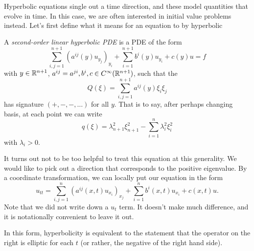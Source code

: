 \documentclass[a4paper]{article}
\begin{document}
Hyperbolic equations single out a time direction, and these model quantities that evolve in time. In this case, we are often interested in initial value problems instead. Let's first define what it means for an equation to by hyperbolic

\begin{defi}
  A \emph{second-order linear hyperbolic PDE} is a PDE of the form
  \[
    \sum_{i, j = 1}^{n + 1} (a^{ij}(y) u_{y_j})_{y_i} + \sum_{i = 1}^{n + 1} b^i(y) u_{y_i} + c(y) u = f
  \]
  with $y \in \mathbb{R}^{n + 1}$, $a^{ij} = a^{ji}, b^i, c \in C^\infty(\mathbb{R}^{n + 1})$, such that the 
  \[
    Q(\xi) = \sum_{i, j = 1}^{n + 1} a^{ij}(y) \xi_i \xi_j
  \]
  has signature $(+, -, -, \ldots)$ for all $y$. That is to say, after perhaps changing basis, at each point we can write
  \[
    q(\xi) = \lambda_{n + 1}^2 \xi_{n + 1}^2 - \sum_{i = 1}^n \lambda_i^2 \xi_i^2
  \]
  with $\lambda_i > 0$.
\end{defi}

It turns out not to be too helpful to treat this equation at this generality. We would like to pick out a direction that corresponds to the positive eigenvalue. By a coordinate transformation, we can locally put our equation in the form
\[
  u_{tt} = \sum_{i, j = 1}^n (a^{ij}(x, t) u_{x_i})_{x_j} + \sum_{i = 1}^n b^i(x, t)u_{x_i} + c(x, t) u.
\]
Note that we did not write down a $u_t$ term. It doesn't make much difference, and it is notationally convenient to leave it out.

In this form, hyperbolicity is equivalent to the statement that the operator on the right is elliptic for each $t$ (or rather, the negative of the right hand side).
\end{document}
